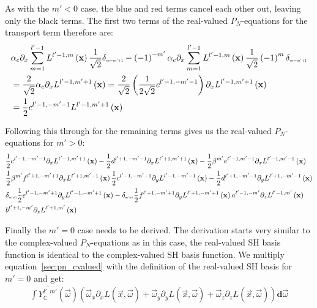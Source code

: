 As with the $m'<0$ case, the blue and red terms cancel each other out, leaving only the black terms. The first two terms of the real-valued $P_N$-equations for the transport term therefore are:
\begin{align*}
&
\alpha_c\partial_x
\sum_{m=1}^{l'-1}L^{l'-1,m}\left (\vec{x}\right)
\frac{1}{\sqrt{2}}
\delta_{\scaleto{m=m'+1}{4pt}}
-
\left({-1}\right)^{-m'}
\alpha_c\partial_x
\sum_{m=1}^{l'-1}L^{l'-1,m}\left (\vec{x}\right)
\frac{1}{\sqrt{2}}
\left({-1}\right)^{m}
\delta_{\scaleto{m=m'+1}{4pt}}
\\&
=
\frac{2}{\sqrt{2}}
\alpha_c\partial_x
L^{l'-1,m'+1}\left (\vec{x}\right)
=
\frac{2}{\sqrt{2}}
\left(\frac{1}{2\sqrt{2}}c^{l'-1, -m'-1}\right)\partial_x
L^{l'-1,m'+1}\left (\vec{x}\right)
\\&
=
\frac{1}{2}c^{l'-1,-m'-1}L^{l'-1,m'+1}\left (\vec{x}\right)
\end{align*}

Following this through for the remaining terms gives us the real-valued $P_N$-equations for $m'>0$:
\begin{align}
&
\frac{1}{2}c^{l'-1,-m'-1}\partial_x L^{l'-1,m'+1}\left (\vec{x}\right)
-\frac{1}{2}d^{l'+1,-m'-1}\partial_x L^{l'+1,m'+1}\left (\vec{x}\right)
-\frac{1}{2}\beta^{m'}e^{l'-1,m'-1}\partial_x L^{l'-1,m'-1}\left (\vec{x}\right)
\nonumber
\\&
\frac{1}{2}\beta^{m'}f^{l'+1,-m'+1}\partial_x L^{l'+1,m'-1}\left (\vec{x}\right)
\frac{1}{2}c^{l'-1,-m'-1}\partial_y L^{l'-1,-m'-1}\left (\vec{x}\right)
-\frac{1}{2}d^{l'+1,-m'-1}\partial_y L^{l'+1,-m'-1}\left (\vec{x}\right)
\nonumber
\\&
\delta_{\scaleto{m'\neq 1}{4pt}}\frac{1}{2}e^{l'-1,-m'+1}\partial_y L^{l'-1,-m'+1}\left (\vec{x}\right)
-\delta_{\scaleto{m'\neq 1}{4pt}}\frac{1}{2}f^{l'+1,-m'+1}\partial_y L^{l'+1,-m'+1}\left (\vec{x}\right)
a^{l'-1,-m'}\partial_z L^{l'-1,m'}\left (\vec{x}\right)
\nonumber
\\&
b^{l'+1,-m'}\partial_z L^{l'+1,m'}\left (\vec{x}\right)
\nonumber
\end{align}

Finally the $m'=0$ case needs to be derived. The derivation starts very similar to the complex-valued $P_N$-equations as in this case, the real-valued SH basis function is identical to the complex-valued SH basis function. We multiply equation~\ref{sec:pn_cvalued} with the definition of the real-valued SH basis for $m'=0$ and get:
\begin{align*}
\int{\overline{Y_{\mathbb{C}}^{l', m'}}(\vec{\omega} )\left(\vec{\omega}_{x}\partial_xL\left (\vec{x} ,\vec{\omega} \right )+\vec{\omega}_{y}\partial_yL\left (\vec{x} ,\vec{\omega} \right )+\vec{\omega}_{z}\partial_zL\left (\vec{x} ,\vec{\omega} \right )\right)\mathbf{d}\vec{\omega}}
\end{align*}

